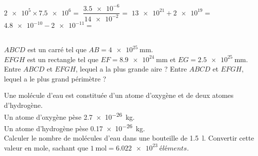 \documentclass[../Cours.tex]{subfiles}
\begin{document}
\begin{questions}
    \vspace{-1.5em}
        \begin{multicols}{2}
            \question $\num{2e5} \times \num{7.5e6} = $
            \question $\dfrac{\num{3.5e-6}}{\num{14e-2}} = $
            \question $\num{13e21} + \num{2e19} = $
            \question $\num{4.8e-10} - \num{2e-11} = $
        \end{multicols}

    \exercice\\
        $ABCD$ est un carré tel que $AB = \qty{4e25}{\milli\metre}$.\\
        $EFGH$ est un rectangle tel que $EF = \qty{8,9e24}{\milli\metre}$ et $EG = \qty{2,5e25}{\milli\metre}$.
        \question Entre $ABCD$ et $EFGH$, lequel a la plus grande aire ?
        \question Entre $ABCD$ et $EFGH$, lequel a le plus grand périmètre ?

        Une molécule d'eau est constituée d'un atome d'oxygène et de deux atomes d'hydrogène.\\
        Un atome d'oxygène pèse \qty{2.7e-26}{kg}.\\
        Un atome d'hydrogène pèse \qty{0.17e-26}{kg}.\\
        \question Calculer le nombre de molécules d'eau dans une bouteille de \qty{1.5}{\litre}.
        \question Convertir cette valeur en mole, sachant que $\qty{1}{\mol} = \qty{6.022e23}{éléments}$. 
\end{questions}
\end{document}
